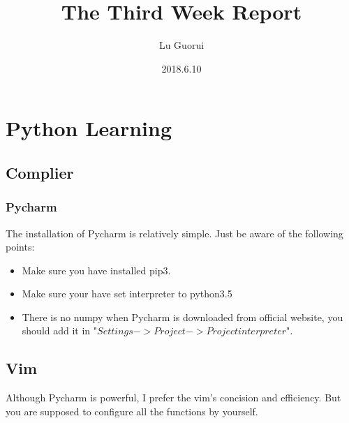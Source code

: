\documentclass{article}
\title{The Third Week Report}
\author{Lu Guorui}
\date{2018.6.10}
\begin{document}
\maketitle
\tableofcontents

\newpage


\section{Python Learning}

\subsection{Complier}
\subsubsection{Pycharm}
The installation of Pycharm is relatively simple. Just be aware of the following points:
\begin{itemize}
\item Make sure you have installed pip3.
\item Make sure your have set interpreter to python3.5
\item There is no numpy when Pycharm is downloaded from official website, you should add it in "$Settings -> Project -> Project interpreter$". 
\end{itemize}

\subsection{Vim}
Although Pycharm is powerful, I prefer the vim's concision and efficiency. But you are supposed to configure all the functions by yourself.
\end{document}
